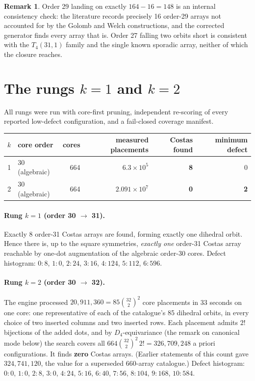 \documentclass[11pt,a4paper,oneside]{report}
\theoremstyle{definition}
\newtheorem{remark}[theorem]{Remark}
\begin{document}
\begin{remark}
Order 29 landing on exactly $164-16=148$ is an internal consistency check: the
literature records precisely 16 order-29 arrays not accounted for by the
Golomb and Welch constructions, and the corrected generator finds every array
that is. Order 27 falling two orbits short is consistent with the $T_4(31,1)$
family and the single known sporadic array, neither of which the closure
reaches.
\end{remark}

\section{The rungs $k=1$ and $k=2$}
\label{p2-sec:rungs}

All rungs were run with core-first pruning, independent re-scoring of every
reported low-defect configuration, and a fail-closed coverage manifest.

\begin{center}
\begin{tabular}{@{}rlrrrr@{}}
\toprule
$k$ & core order & cores & measured placements & Costas found & minimum defect \\
\midrule
1 & 30 (algebraic) & 664 & $6.3\times10^5$ & \textbf{8} & 0 \\
2 & 30 (algebraic) & 664 & $2.091\times10^{7}$ & \textbf{0} & \textbf{2} \\
\bottomrule
\end{tabular}
\end{center}

\paragraph{Rung $k=1$ (order 30 $\to$ 31).}
Exactly 8 order-31 Costas arrays are found, forming exactly one dihedral orbit.
Hence there is, up to the square symmetries, \emph{exactly one} order-31 Costas
array reachable by one-dot augmentation of the algebraic order-30 cores. Defect
histogram: $0{:}8$, $1{:}0$, $2{:}24$, $3{:}16$, $4{:}124$, $5{:}112$,
$6{:}596$.

\paragraph{Rung $k=2$ (order 30 $\to$ 32).}
The engine processed $20{,}911{,}360=85\binom{32}{2}^2$ core placements in 33 seconds on one core: one representative of each of the catalogue's 85
dihedral orbits, in every choice of two inserted columns and two inserted rows. Each placement admits $2!$ bijections of the
added dots, and by $D_4$-equivariance (the remark on canonical mode below) the search covers all $664\binom{32}{2}^2\,2!=326{,}709{,}248$ a priori configurations. It
finds \textbf{zero} Costas arrays. (Earlier statements of this count gave $324{,}741{,}120$, the value for a superseded 660-array catalogue.)
Defect histogram: $0{:}0$, $1{:}0$, $2{:}8$, $3{:}0$, $4{:}24$, $5{:}16$,
$6{:}40$, $7{:}56$, $8{:}104$, $9{:}168$, $10{:}584$.
\end{document}

